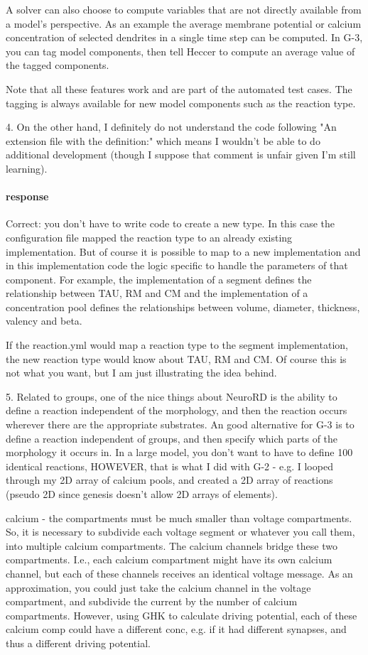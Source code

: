 \documentclass[12pt]{article}
\begin{document}
A solver can also choose to compute variables that are not directly
available from a model's perspective.  As an example the average
membrane potential or calcium concentration of selected dendrites in a
single time step can be computed.  In G-3, you can tag model
components, then tell Heccer to compute an average value of the tagged
components.

Note that all these features work and are part of the automated test
cases.  The tagging is always available for new model components such
as the reaction type.



4. On the other hand, I definitely do not understand the code
following "An extension file with the definition:" which means I
wouldn't be able to do additional development (though I suppose that
comment is unfair given I'm still learning).

\paragraph{response} Correct: you don't have to write code to create a
new type.  In this case the configuration file mapped the reaction
type to an already existing implementation.  But of course it is
possible to map to a new implementation and in this implementation
code the logic specific to handle the parameters of that component.
For example, the implementation of a segment defines the relationship
between TAU, RM and CM and the implementation of a concentration pool
defines the relationships between volume, diameter, thickness, valency
and beta.

If the reaction.yml would map a reaction type to the segment
implementation, the new reaction type would know about TAU, RM and CM.
Of course this is not what you want, but I am just illustrating the
idea behind.


5. Related to groups, one of the nice things about NeuroRD is the
ability to define a reaction independent of the morphology, and then
the reaction occurs wherever there are the appropriate substrates.  An
good alternative for G-3 is to define a reaction independent of
groups, and then specify which parts of the morphology it occurs in.
In a large model, you don't want to have to define 100 identical
reactions, HOWEVER, that is what I did with G-2 - e.g. I looped
through my 2D array of calcium pools, and created a 2D array of
reactions (pseudo 2D since genesis doesn't allow 2D arrays of
elements).

calcium - the compartments must be much smaller than voltage
compartments.  So, it is necessary to subdivide each voltage segment
or whatever you call them, into multiple calcium compartments.  The
calcium channels bridge these two compartments.  I.e., each calcium
compartment might have its own calcium channel, but each of these
channels receives an identical voltage message.  As an approximation,
you could just take the calcium channel in the voltage compartment,
and subdivide the current by the number of calcium compartments.
However, using GHK to calculate driving potential, each of these
calcium comp could have a different conc, e.g. if it had different
synapses, and thus a different driving potential.
\end{document}
